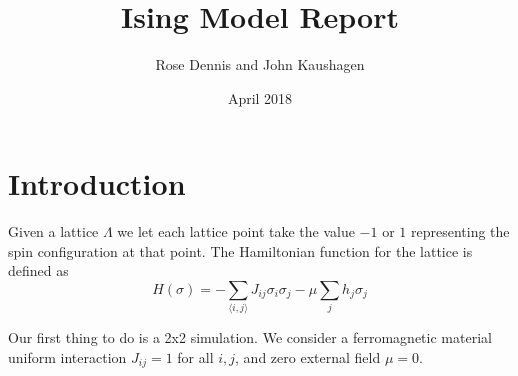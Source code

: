 \documentclass{article}
\title{Ising Model Report}
\author{Rose Dennis and John Kaushagen}
\date{April 2018}
\begin{document}
\maketitle

\section{Introduction}
Given a lattice $\Lambda$ we let each lattice point take the value $-1$  or $1$
representing the spin configuration at that point. The Hamiltonian function for
the lattice is defined as
\[
    H(\sigma) = -\sum_{\langle i,j\rangle}J_{ij}\sigma_i\sigma_j
    -\mu\sum_{j}h_j\sigma_j
\]

Our first thing to do is a 2x2 simulation. We consider a ferromagnetic material
uniform interaction $J_{ij}=1$ for all $i,j$, and zero external field $\mu=0$.
\end{document}
